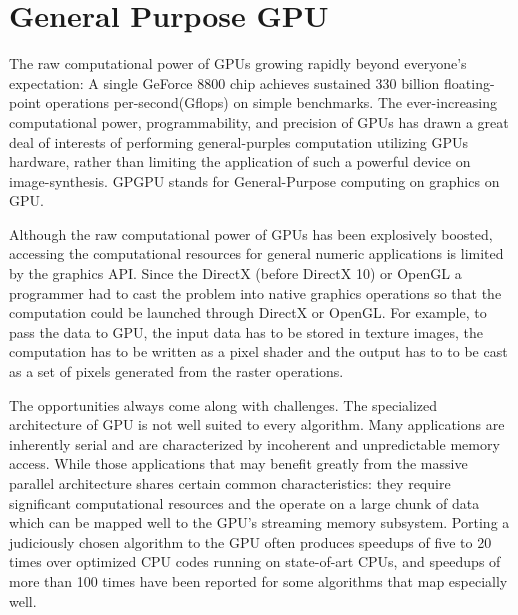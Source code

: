 \begin{comment}
\begin{figure}[htp]
    \centering 
    \fbox{\texttt{[image: .pdf]}} 
    \label{fig:unified_shaders_pipeline} 
    \renewcommand{\thefigure}{\thechapter.\arabic{figure}}
    \caption[Unified Shaders Graphics Pipeline]{\emph{Unified Shaders Graphics Pipeline}}
\end{figure}
\end{comment}

\section{General Purpose GPU}
The raw computational power of GPUs growing rapidly beyond everyone's expectation: A single GeForce 8800 chip achieves sustained 330 billion floating-point operations per-second(Gflops) on simple benchmarks. The ever-increasing computational power, programmability, and precision of GPUs has drawn a great deal of interests of performing general-purples computation utilizing GPUs hardware, rather than limiting the application of such a powerful device on image-synthesis. GPGPU stands for General-Purpose computing on graphics on GPU.


Although the raw computational power of GPUs has been explosively boosted, accessing the computational resources for general numeric applications is limited by the graphics API. Since the DirectX (before DirectX 10) or OpenGL a programmer had to cast the problem into native graphics operations so that the computation could be launched through DirectX or OpenGL. For example, to pass the data to GPU, the input data has to be stored in texture images, the computation has to be written as a pixel shader and the output has to to be cast as a set of pixels generated from the raster operations.

The opportunities always come along with challenges. The specialized architecture of GPU is not well suited to every algorithm. Many applications are inherently serial and are characterized by incoherent and unpredictable memory access. While those applications that may benefit greatly  from the massive parallel architecture shares certain common characteristics: they require significant computational resources and the operate on a large chunk of data which can be mapped well to the GPU's streaming memory subsystem. Porting a judiciously chosen algorithm to the GPU often produces speedups of five to 20 times over optimized CPU codes running on state-of-art CPUs, and speedups of more than 100 times have been reported for some algorithms that map especially well.

